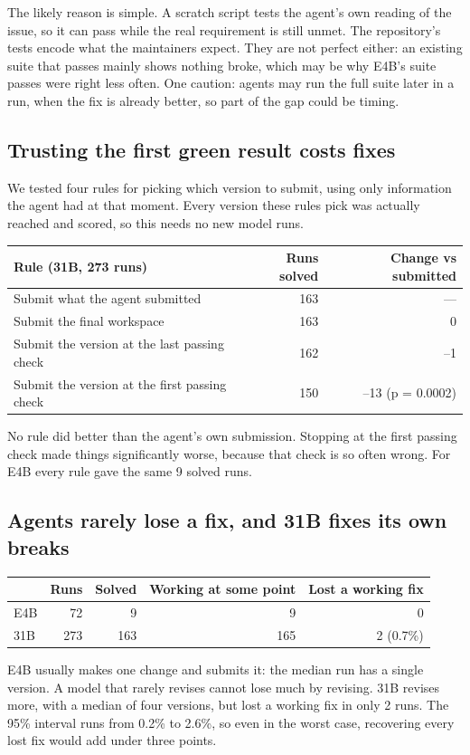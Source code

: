 \documentclass[10pt]{article}
\begin{document}
The likely reason is simple. A scratch script tests the agent's own reading of the issue, so it can pass while the real requirement is still unmet. The repository's tests encode what the maintainers expect. They are not perfect either: an existing suite that passes mainly shows nothing broke, which may be why E4B's suite passes were right less often. One caution: agents may run the full suite later in a run, when the fix is already better, so part of the gap could be timing.

\subsection*{Trusting the first green result costs fixes}
We tested four rules for picking which version to submit, using only information the agent had at that moment. Every version these rules pick was actually reached and scored, so this needs no new model runs.

\begin{center}\small\begin{tabular}{lrr}\toprule
\textbf{Rule (31B, 273 runs)} & \textbf{Runs solved} & \textbf{Change vs submitted} \\ \midrule
Submit what the agent submitted & 163 & --- \\
Submit the final workspace & 163 & 0 \\
Submit the version at the last passing check & 162 & --1 \\
Submit the version at the first passing check & 150 & --13 (p = 0.0002) \\
\bottomrule\end{tabular}\end{center}
No rule did better than the agent's own submission. Stopping at the first passing check made things significantly worse, because that check is so often wrong. For E4B every rule gave the same 9 solved runs.

\subsection*{Agents rarely lose a fix, and 31B fixes its own breaks}
\begin{center}\small\begin{tabular}{lrrrr}\toprule
\textbf{} & \textbf{Runs} & \textbf{Solved} & \textbf{Working at some point} & \textbf{Lost a working fix} \\ \midrule
E4B & 72 & 9 & 9 & 0 \\
31B & 273 & 163 & 165 & 2 (0.7\%) \\
\bottomrule\end{tabular}\end{center}
E4B usually makes one change and submits it: the median run has a single version. A model that rarely revises cannot lose much by revising. 31B revises more, with a median of four versions, but lost a working fix in only 2 runs. The 95\% interval runs from 0.2\% to 2.6\%, so even in the worst case, recovering every lost fix would add under three points.
\end{document}
